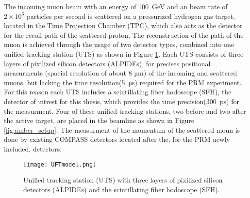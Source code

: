 The incoming muon beam with an energy of \SI{100} {\giga\electronvolt}\autocite{ProposalAmber} and an beam rate of $2 \times 10^6$\autocite{ConfrancePaperDAQ} particles per second is scattered on a pressurized hydrogen gas target,
located in the Time Projection Chamber (TPC), 
which also acts as the detector for the recoil path of the scattered proton.
\newline
The reconstruction of the path of the muon is achieved through the usage of two detector types,
 combined into one unified tracking station (UTS) as shown in Figure \ref{UTSpicture}.
\newline
Each UTS consists of three layers of pixilized silicon detectors (ALPIDEs), for precises positional measurments (spacial resolution of about 8 µm\autocite{Amber2022Status}) of the incoming and scattered muons, 
but lacking the time resolution(\SI{5} {\micro\second}\autocite{Amber2022Status}) required for the PRM experiment.
For this reason each UTS includes a scintillating fiber hodoscope (SFH), the detector of intrest for this thesis,
 which provides the time precision(\SI{300} {\pico\second}\Autocite{Amber2022Status}) for the measurment.
 \newline
Four of these unified tracking stations, two before and two after the active target, are placed in the beamline as shown in Figure \ref{fig:amber_setup}.
The measurment of the momentum of the scattered moun is done by existing COMPASS detectors located after the, 
for the PRM newly included, detectors\autocite{ProposalAmber}.

\begin{figure}[H]	
	\centering
	\texttt{[image: UFTmodel.png]}
	\caption{Unified tracking station (UTS) with three layers of pixilized silicon detectors (ALPIDEs) and the scintillating fiber hodoscope (SFH).\autocite{InternalcommunicationKarl}}
	\label{UTSpicture}
\end{figure}
